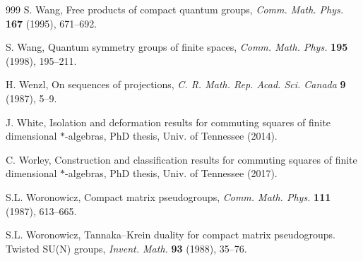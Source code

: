 \documentclass[11pt]{amsart}
\begin{document}
\begin{thebibliography}{999}
 S. Wang, Free products of compact quantum groups, {\em Comm. Math. Phys.} {\bf 167} (1995), 671--692.

 S. Wang, Quantum symmetry groups of finite spaces, {\em Comm. Math. Phys.} {\bf 195} (1998), 195--211.

 H. Wenzl, On sequences of projections, {\em C. R. Math. Rep. Acad. Sci. Canada} {\bf 9} (1987), 5--9.

 J. White, Isolation and deformation results for commuting squares of finite dimensional $*$-algebras, PhD thesis, Univ. of Tennessee (2014).

 C. Worley, Construction and classification results for commuting squares of finite dimensional $*$-algebras, PhD thesis, Univ. of Tennessee (2017).

 S.L. Woronowicz, Compact matrix pseudogroups, {\em Comm. Math. Phys.} {\bf 111} (1987), 613--665.

 S.L. Woronowicz, Tannaka--Krein duality for compact matrix pseudogroups. Twisted SU(N) groups, {\em Invent. Math.} {\bf 93} (1988), 35--76.

\end{thebibliography}
\end{document}
